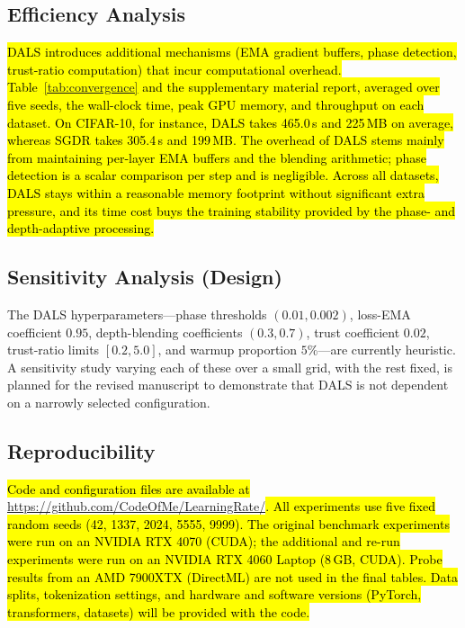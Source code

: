 \documentclass[a4paper,fleqn]{cas-dc}
\begin{document}
\subsection{Efficiency Analysis}\label{sec:efficiency}

\hl{DALS introduces additional mechanisms (EMA gradient buffers, phase detection, trust-ratio computation) that incur computational overhead. Table~\ref{tab:convergence} and the supplementary material report, averaged over five seeds, the wall-clock time, peak GPU memory, and throughput on each dataset. On CIFAR-10, for instance, DALS takes 465.0\,s and 225\,MB on average, whereas SGDR takes 305.4\,s and 199\,MB. The overhead of DALS stems mainly from maintaining per-layer EMA buffers and the blending arithmetic; phase detection is a scalar comparison per step and is negligible. Across all datasets, DALS stays within a reasonable memory footprint without significant extra pressure, and its time cost buys the training stability provided by the phase- and depth-adaptive processing.}

\subsection{Sensitivity Analysis (Design)}\label{sec:sensitivity}

The DALS hyperparameters---phase thresholds $(0.01,0.002)$, loss-EMA coefficient $0.95$, depth-blending coefficients $(0.3,0.7)$, trust coefficient $0.02$, trust-ratio limits $[0.2,5.0]$, and warmup proportion $5\%$---are currently heuristic. A sensitivity study varying each of these over a small grid, with the rest fixed, is planned for the revised manuscript to demonstrate that DALS is not dependent on a narrowly selected configuration.

\subsection{Reproducibility}\label{sec:reproducibility}

\hl{Code and configuration files are available at }\url{https://github.com/CodeOfMe/LearningRate/}\hl{. All experiments use five fixed random seeds (42, 1337, 2024, 5555, 9999). The original benchmark experiments were run on an NVIDIA RTX 4070 (CUDA); the additional and re-run experiments were run on an NVIDIA RTX 4060 Laptop (8\,GB, CUDA). Probe results from an AMD 7900XTX (DirectML) are not used in the final tables. Data splits, tokenization settings, and hardware and software versions (PyTorch, transformers, datasets) will be provided with the code.}
\end{document}
